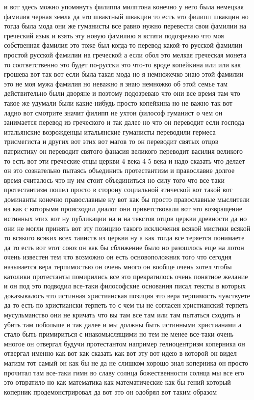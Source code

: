 и вот здесь можно упомянуть филиппа милптона конечно у него была немецкая
фамилия черная земля да это швактный швакцин то есть это филипп швакцин но тогда
была мода они же гуманисты все равно нужно перевести свои фамилии на греческий
язык и взять эту новую фамилию я кстати подозреваю что моя собственная фамилия
это тоже был когда-то перевод какой-то русской фамилии простой русской фамилии
на греческой а если обол это мелкая греческая монета то соответственно это будет
по-русски это что-то вроде копейкина или или как грошева вот так вот если была
такая мода но я немножечко знаю этой фамилии это не моя мужа фамилия но неважно
я знаю немножко об этой семье там действительно были дворяне и поэтому
подозреваю что они все время там что такое же удумали были какие-нибудь просто
копейкина но не важно так вот ладно вот смотрите значит филипп не ухтон философ
гуманист о чем он занимается перевод из греческого и так далее но что он
переводит если господа итальянские возрожденцы итальянские гуманисты переводили
гермеса трисмегиста и других вот этих вот магов то он переводит святых отцов
патристику он переводит святого фанасия великого переводит василия великого то
есть вот эти греческие отцы церкви 4 века 4 5 века и надо сказать что делает он
это сознательно пытаясь объединить протестантизм и православие долгое время
считалось что ну им стоит объединиться но силу того что все таки протестантизм
пошел просто в сторону социальной этической вот такой вот доминанты конечно
православные ну вот как бы просто православные мыслители из как с которыми
происходил диалог они приветствовали вот это возвращение истинных этих вот ну
публикации на и на текстов отцов церкви древности да но они не могли принять вот
эту позицию такого исключения всякой мистики всякой то всякого всяких всех
таинств из церкви ну а как тогда все теряется понимаете да то есть вот этот союз
он как бы сближение было но разошлось еще на лотон очень известен тем что
возможно он есть основоположник того что сегодня называется вера терпимостью он
очень много он вообще очень хотел чтобы католики протестанты помирились все это
прекратилось очень понятное желание и он под это подводил все-таки философские
основания писал тексты в которых доказывалось что истинная христианская позиция
это вера терпимость чувствуете да то есть по христиански терпеть то с чем ты не
согласен христианский терпеть мусульманство они не кричать что вы там все там
или там пытаться сходить и убить там побольше и так далее и мы должны быть
истинными христианами а стало быть примириться с инакомыслящими но тем не менее
все-таки очень многое он отвергал будучи протестантом например гелиоцентризм
коперника он отвергал именно как вот как сказать как вот эту вот идею в которой
он видел магизм тот самый он как бы не да не слишком хорошо знал коперника он
просто прочитал там все-таки гимн во славу солнца божественности солнца мы все
его это отвратило но как математика как математические как бы гений который
коперник продемонстрировал да вот это он одобрял вот таким образом 


